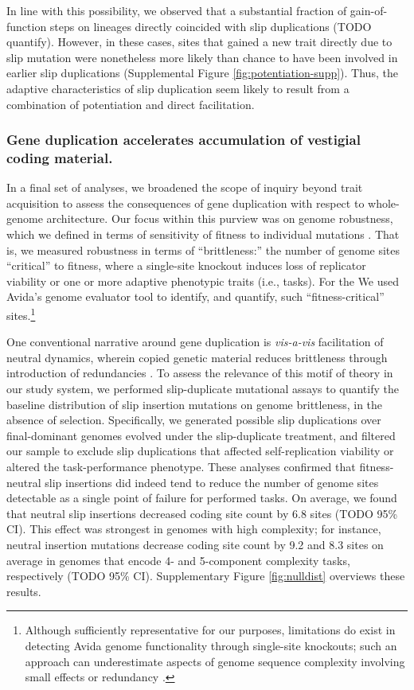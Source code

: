 In line with this possibility, we observed that a substantial fraction of gain-of-function steps on lineages directly coincided with slip duplications (TODO quantify).
However, in these cases, sites that gained a new trait directly due to slip mutation were nonetheless more likely than chance to have been involved in earlier slip duplications (Supplemental Figure \ref{fig:potentiation-supp}).
Thus, the adaptive characteristics of slip duplication seem likely to result from a combination of potentiation and direct facilitation.

\subsubsection{Gene duplication accelerates accumulation of vestigial coding material.}



In a final set of analyses, we broadened the scope of inquiry beyond trait acquisition to assess the consequences of gene duplication with respect to whole-genome architecture.
Our focus within this purview was on genome robustness, which we defined in terms of sensitivity of fitness to individual mutations \citep{lenski1999genome}.
That is, we measured robustness in terms of ``brittleness:'' the number of genome sites ``critical'' to fitness, where a single-site knockout induces loss of replicator viability or one or more adaptive phenotypic traits (i.e., tasks).
For the We used Avida's genome evaluator tool to identify, and quantify, such ``fitness-critical'' sites.\footnote{%
Although sufficiently representative for our purposes, limitations do exist in detecting Avida genome functionality through single-site knockouts; such an approach can underestimate aspects of genome sequence complexity involving small effects or redundancy \citep{lenski1999genome,moreno2024cryptic}.
}

One conventional narrative around gene duplication is \textit{vis-a-vis} facilitation of neutral dynamics, wherein copied genetic material reduces brittleness through introduction of redundancies \citep{wagner1996genetic}.
To assess the relevance of this motif of theory in our study system, we performed slip-duplicate mutational assays to quantify the baseline distribution of slip insertion mutations on genome brittleness, in the absence of selection.
Specifically, we generated possible slip duplications over final-dominant genomes evolved under the slip-duplicate treatment, and filtered our sample to exclude slip duplications that affected self-replication viability or altered the task-performance phenotype.
These analyses confirmed that fitness-neutral slip insertions did indeed tend to reduce the number of genome sites detectable as a single point of failure for performed tasks.
On average, we found that neutral slip insertions decreased coding site count by 6.8 sites (TODO 95\% CI).
This effect was strongest in genomes with high complexity; for instance, neutral insertion mutations decrease coding site count by 9.2 and 8.3 sites on average in genomes that encode 4- and 5-component complexity tasks, respectively (TODO 95\% CI).
Supplementary Figure \ref{fig:nulldist} overviews these results.

